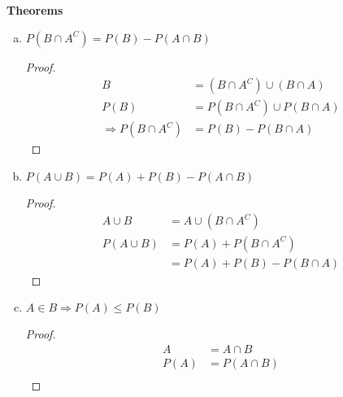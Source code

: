 \documentclass[11pt]{article}
\begin{document}
\newpage
\noindent\textbf{Theorems}
\begin{enumerate}[(a)]
\item $P(B \cap A^C) = P(B) - P(A \cap B)$
\begin{multicols}{2}
\begin{proof}
	\begin{align*}
	B &= (B \cap A^C) \cup (B \cap A) \\
	P(B) &= P(B \cap A^C) \cup P(B \cap A) \\
	\Rightarrow P(B \cap A^C) &= P(B) - P(B \cap A)
	\end{align*}
\end{proof}
\columnbreak %
\begin{center}
\end{center}
\end{multicols}
\item $P(A \cup B) = P(A) + P(B) - P(A \cap B)$
\begin{multicols}{2}
\begin{proof}
	\begin{align*}
	A \cup B &= A \cup (B \cap A^C) \\
	P(A \cup B) &= P(A) + P(B \cap A^C) \\
	&= P(A) + P(B) - P(B \cap A)
	\end{align*}
\end{proof}
\columnbreak %
\vspace*{20pt}
\end{multicols}
\item $A \in B \Rightarrow P(A) \leq P(B)$
\begin{multicols}{2}
\begin{proof}
	\begin{align*}
	A &= A \cap B \\
	P(A) &= P(A \cap B) \\

\end{align*}
\end{proof}
\end{multicols}
\end{enumerate}
\end{document}
